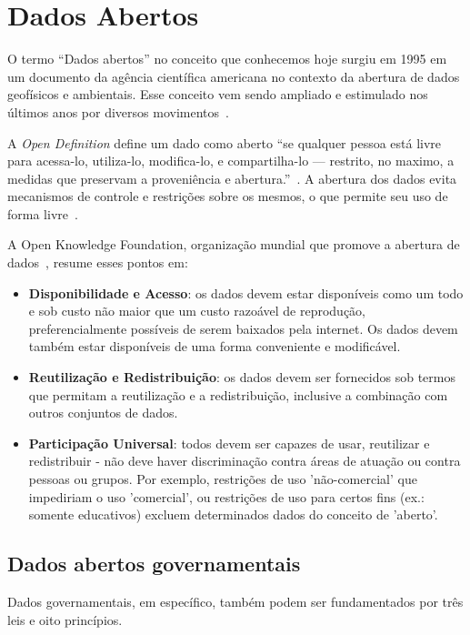 \chapter{Dados Abertos}

O termo \enquote{Dados abertos} no conceito que conhecemos hoje surgiu em 1995 em um documento da agência científica americana no contexto da abertura de dados geofísicos e ambientais. Esse conceito vem sendo ampliado e estimulado nos últimos anos por diversos movimentos~\cite{seijiconectados}. 

A \emph{Open Definition} define um dado como aberto \enquote{se qualquer pessoa está livre para acessa-lo, utiliza-lo, modifica-lo, e compartilha-lo — restrito, no maximo, a medidas que preservam a proveniência e abertura.}~\cite{opendefinition}. A abertura dos dados evita mecanismos de controle e restrições sobre os mesmos, o que permite seu uso de forma livre~\cite{seijiconectados}.

A Open Knowledge Foundation, organização mundial que promove a abertura de dados~\cite{openknowledge}, resume esses pontos em:

\begin{itemize}
\item \textbf{Disponibilidade e Acesso}: os dados devem estar disponíveis como um todo e sob custo não maior que um custo razoável de reprodução, preferencialmente possíveis de serem baixados pela internet. Os dados devem também estar disponíveis de uma forma conveniente e modificável.

\item \textbf{Reutilização e Redistribuição}: os dados devem ser fornecidos sob termos que permitam a reutilização e a redistribuição, inclusive a combinação com outros conjuntos de dados.

\item \textbf{Participação Universal}: todos devem ser capazes de usar, reutilizar e redistribuir - não deve haver discriminação contra áreas de atuação ou contra pessoas ou grupos. Por exemplo, restrições de uso 'não-comercial' que impediriam o uso 'comercial', ou restrições de uso para certos fins (ex.: somente educativos) excluem determinados dados do conceito de 'aberto'.
\end{itemize}

\section{Dados abertos governamentais}
Dados governamentais, em específico, também podem ser fundamentados por três leis e oito princípios.

